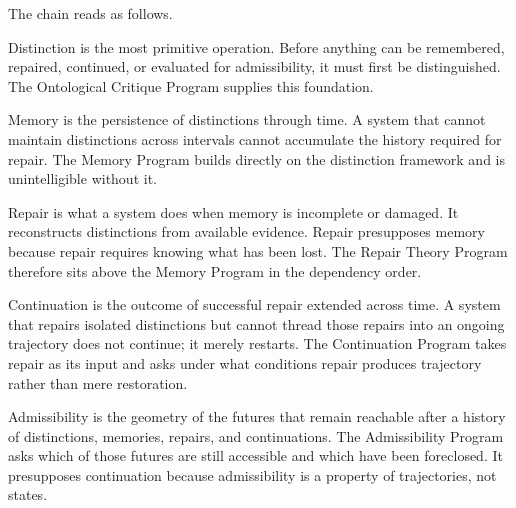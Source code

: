 \documentclass[12pt, openany]{book}
\begin{document}
\bigskip

\begin{center}
\end{center}

\bigskip

The chain reads as follows.

Distinction is the most primitive operation. Before anything can be
remembered, repaired, continued, or evaluated for admissibility, it must
first be distinguished. The Ontological Critique Program supplies this
foundation.

Memory is the persistence of distinctions through time. A system that
cannot maintain distinctions across intervals cannot accumulate the
history required for repair. The Memory Program builds directly on the
distinction framework and is unintelligible without it.

Repair is what a system does when memory is incomplete or damaged. It
reconstructs distinctions from available evidence. Repair presupposes
memory because repair requires knowing what has been lost. The Repair
Theory Program therefore sits above the Memory Program in the dependency
order.

Continuation is the outcome of successful repair extended across time. A
system that repairs isolated distinctions but cannot thread those repairs
into an ongoing trajectory does not continue; it merely restarts. The
Continuation Program takes repair as its input and asks under what
conditions repair produces trajectory rather than mere restoration.

Admissibility is the geometry of the futures that remain reachable after
a history of distinctions, memories, repairs, and continuations. The
Admissibility Program asks which of those futures are still accessible
and which have been foreclosed. It presupposes continuation because
admissibility is a property of trajectories, not states.
\end{document}
